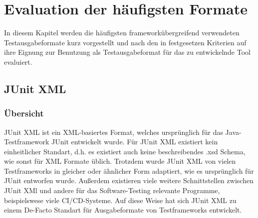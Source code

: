 
\newpage

\section{Evaluation der häufigsten Formate}
In diesem Kapitel werden die häufigsten frameworkübergreifend verwendeten Testausgabeformate kurz vorgestellt und nach den in  festgesetzen Kriterien auf ihre Eignung zur Benutzung als Testausgabeformat für das zu entwickelnde Tool evaluiert.

\subsection{JUnit XML}\label{JUNIT}
\subsubsection{Übersicht}
JUnit XML ist ein XML-basiertes Format, welches ursprünglich für das Java-Testframework JUnit entwickelt wurde. Für JUnit XML existiert kein einheitlicher Standart, d.h. es existiert auch keine beschreibendes .xsd Schema, wie sonst für XML Formate üblich. Trotzdem wurde JUnit XML von vielen Testframeworks in gleicher oder ähnlicher Form adaptiert, wie es ursprünglich für JUnit entworfen wurde. Außerdem existieren viele weitere Schnittstellen zwischen JUnit XMl und andere für das Software-Testing relevante Programme, beispielswese viele CI/CD-Systeme. %
Auf diese Weise hat sich JUnit XML zu einem De-Facto Standart für Ausgabeformate von Testframeworks entwickelt.


